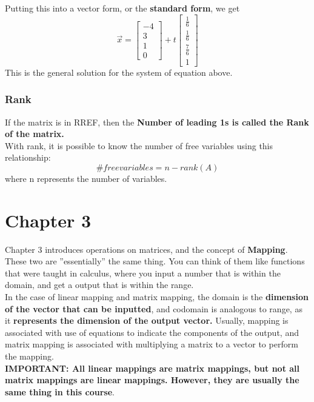 \documentclass[12pt]{article}
\begin{document}
Putting this into a vector form, or the \textbf{standard form},  we get\\
\begin{equation}
\vec{x} = \begin{bmatrix}-4\\3\\1\\0\end{bmatrix} + t\begin{bmatrix}\frac{1}{6}\\\frac{1}{6}\\\frac{7}{6}\\1\end{bmatrix}
\end{equation}
This is the general solution for the system of equation above.

\subsubsection{Rank}
If the matrix is in RREF, then the \textbf{Number of leading 1s is called the Rank of the matrix.}\\
With rank, it is possible to know the number of free variables using this relationship:
\begin{equation}
\#free variables = n - rank(A)
\end{equation}
where n represents the number of variables. 

\section{Chapter 3}
Chapter 3 introduces  operations on matrices, and the concept of \textbf{Mapping}. %
These two are ''essentially'' the same thing. You can think of them like functions that were taught in calculus, where you input a number that is within the domain, and get a output that is within the range.\\
In the case of linear mapping and matrix mapping, the domain is the \textbf{dimension of the vector that can be inputted}, and codomain is analogous to range, as it \textbf{represents the dimension of the output vector.} 
Usually, mapping is associated with use of equations to indicate the components of the output, and matrix mapping is associated with multiplying a matrix to a vector to perform the mapping.\\
\textbf{IMPORTANT: All linear mappings are matrix mappings, but not all matrix mappings are linear mappings. However, they are usually the same thing in this course}.
\end{document}
